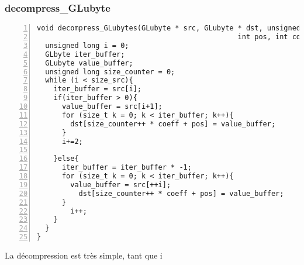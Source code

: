 \documentclass[12pt, letterpaper]{article}
\begin{document}
\subsubsection{decompress\_GLubyte}
\begin{Verbatim}[numbers=left,xleftmargin = 5mm]
void decompress_GLubytes(GLubyte * src, GLubyte * dst, unsigned long size_src, 
                                                int pos, int coeff){
  unsigned long i = 0;
  GLbyte iter_buffer;
  GLubyte value_buffer;
  unsigned long size_counter = 0;
  while (i < size_src){
    iter_buffer = src[i];
    if(iter_buffer > 0){
      value_buffer = src[i+1];
      for (size_t k = 0; k < iter_buffer; k++){
        dst[size_counter++ * coeff + pos] = value_buffer;
      }
      i+=2;

    }else{ 
      iter_buffer = iter_buffer * -1;
      for (size_t k = 0; k < iter_buffer; k++){
        value_buffer = src[++i];
          dst[size_counter++ * coeff + pos] = value_buffer;
      }
        i++;               
    }
  }
}
\end{Verbatim}
La décompression est très simple, tant que i




 
\end{document}
